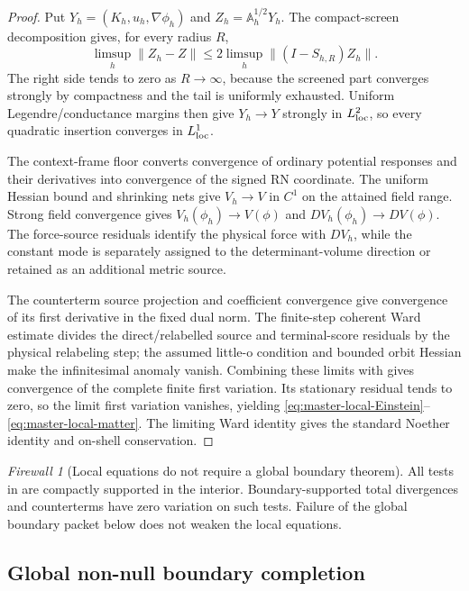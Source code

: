 \documentclass[11pt]{article}
\theoremstyle{definition}
\theoremstyle{remark}
\newtheorem{firewall}[theorem]{Firewall}
\begin{document}
\begin{proof}
Put \(Y_h=(K_h,u_h,\nabla\phi_h)\) and
\(Z_h=\mathbb A_h^{1/2}Y_h\).  The compact-screen decomposition gives, for
every radius \(R\),
\[
 \limsup_h\|Z_h-Z\|
 \le2\limsup_h\|(I-S_{h,R})Z_h\|.
\]
The right side tends to zero as \(R\to\infty\), because the screened part
converges strongly by compactness and the tail is uniformly exhausted.  Uniform
Legendre/conductance margins then give \(Y_h\to Y\) strongly in
\(L^2_{\rm loc}\), so every quadratic insertion converges in \(L^1_{\rm loc}\).

The context-frame floor converts convergence of ordinary potential responses
and their derivatives into convergence of the signed RN coordinate.  The
uniform Hessian bound and shrinking nets give \(V_h\to V\) in \(C^1\) on the
attained field range.  Strong field convergence gives
\(V_h(\phi_h)\to V(\phi)\) and
\(DV_h(\phi_h)\to DV(\phi)\).  The force-source residuals identify the
physical force with \(DV_h\), while the constant mode is separately assigned
to the determinant-volume direction or retained as an additional metric
source.

The counterterm source projection and coefficient convergence give convergence
of its first derivative in the fixed dual norm.  The finite-step coherent Ward
estimate divides the direct/relabelled source and terminal-score residuals by
the physical relabeling step; the assumed little-o condition and bounded orbit
Hessian make the infinitesimal anomaly vanish.  Combining these limits with
 gives convergence of the complete
finite first variation.  Its stationary residual tends to zero, so the limit
first variation vanishes, yielding
\eqref{eq:master-local-Einstein}--\eqref{eq:master-local-matter}.  The limiting
Ward identity gives the standard Noether identity and on-shell conservation.
\end{proof}

\begin{firewall}[Local equations do not require a global boundary theorem]
All tests in  are compactly supported in
the interior.  Boundary-supported total divergences and counterterms have zero
variation on such tests.  Failure of the global boundary packet below does not
weaken the local equations.
\end{firewall}

\subsection{Global non-null boundary completion}
\end{document}
